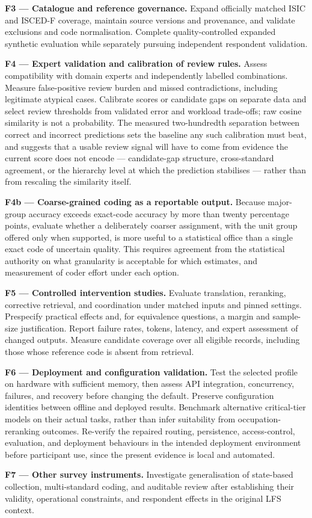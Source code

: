 \noindent\textbf{F3 --- Catalogue and reference governance.}
Expand officially matched ISIC and ISCED-F coverage, maintain source
versions and provenance, and validate exclusions and code normalisation.
Complete quality-controlled expanded synthetic evaluation while
separately pursuing independent respondent validation.

\noindent\textbf{F4 --- Expert validation and calibration of review rules.}
Assess compatibility with domain experts and independently labelled
combinations. Measure false-positive review burden and missed contradictions,
including legitimate atypical cases. Calibrate scores or candidate gaps
on separate data and select review thresholds from validated error and
workload trade-offs; raw cosine similarity is not a probability. The
measured two-hundredth separation between correct and incorrect
predictions sets the baseline any such calibration must beat, and suggests
that a usable review signal will have to come from evidence the current
score does not encode --- candidate-gap structure, cross-standard
agreement, or the hierarchy level at which the prediction stabilises ---
rather than from rescaling the similarity itself.

\noindent\textbf{F4b --- Coarse-grained coding as a reportable output.}
Because major-group accuracy exceeds exact-code accuracy by more than
twenty percentage points, evaluate whether a deliberately coarser
assignment, with the unit group offered only when supported, is more
useful to a statistical office than a single exact code of uncertain
quality. This requires agreement from the statistical authority on what
granularity is acceptable for which estimates, and measurement of coder
effort under each option.

\noindent\textbf{F5 --- Controlled intervention studies.}
Evaluate translation, reranking, corrective retrieval, and coordination
under matched inputs and pinned settings. Prespecify practical effects
and, for equivalence questions, a margin and sample-size justification.
Report failure rates, tokens, latency, and expert assessment of changed
outputs. Measure candidate coverage over all eligible records, including
those whose reference code is absent from retrieval.

\noindent\textbf{F6 --- Deployment and configuration validation.}
Test the selected profile on hardware with sufficient memory, then assess
API integration, concurrency, failures, and recovery before changing the
default. Preserve configuration identities between offline and deployed
results. Benchmark alternative critical-tier models on their actual tasks,
rather than infer suitability from occupation-reranking outcomes.
Re-verify the repaired routing, persistence, access-control, evaluation,
and deployment behaviours in the intended deployment environment before
participant use, since the present evidence is local and automated.

\noindent\textbf{F7 --- Other survey instruments.}
Investigate generalisation of state-based collection, multi-standard
coding, and auditable review after establishing their validity, operational
constraints, and respondent effects in the original LFS context.
